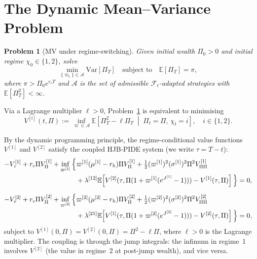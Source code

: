 \documentclass[11pt,a4paper]{article}
\numberwithin{equation}{section}
\newtheorem{problem}[theorem]{Problem}
\newcommand{\E}{\mathbb{E}}
\newcommand{\Var}{\mathrm{Var}}
\newcommand{\F}{\mathcal{F}}
\begin{document}
\section{The Dynamic Mean--Variance Problem}\label{sec:mv}


\begin{problem}[MV under regime-switching]\label{prob:mv}
Given initial wealth $\Pi_0 > 0$ and initial regime $\chi_0 \in \{1,2\}$, solve
\begin{equation}\label{eq:mv_problem}
\min_{\{\varpi_t\} \in \mathcal{A}} \Var[\Pi_T] \quad \text{subject to} \quad \E[\Pi_T] = \pi,
\end{equation}
where $\pi > \Pi_0 e^{r_c T}$ and $\mathcal{A}$ is the set of admissible $\F_t$-adapted strategies with $\E[\Pi_T^2] < \infty$.
\end{problem}

Via a Lagrange multiplier $\ell > 0$, Problem~\ref{prob:mv} is equivalent to minimising
\begin{equation}\label{eq:J_def}
V^{[i]}(t, \Pi) := \inf_{\varpi \in \mathcal{A}} \E\!\left[\Pi_T^2 - \ell \Pi_T \;\middle|\; \Pi_t = \Pi,\, \chi_t = i\right], \quad i \in \{1,2\}.
\end{equation}


By the dynamic programming principle, the regime-conditional value functions $V^{[1]}$ and $V^{[2]}$ satisfy the coupled HJB-PIDE system (we write $\tau = T - t$):
\begin{align}
-V^{[1]}_\tau + r_c\Pi V^{[1]}_\Pi + \inf_{\varpi^{[1]}} \Big\{& \varpi^{[1]}(\mu^{[1]} - r_h)\Pi V^{[1]}_\Pi + \tfrac{1}{2}(\varpi^{[1]})^2 (\sigma^{[1]})^2 \Pi^2 V^{[1]}_{\Pi\Pi} \notag \\
& + \lambda^{[12]} \E\!\left[V^{[2]}(\tau, \Pi(1+\varpi^{[1]}(e^{J^{[1]}}-1))) - V^{[1]}(\tau, \Pi)\right] \Big\} = 0, \label{eq:hjb1} \\[6pt]
-V^{[2]}_\tau + r_c\Pi V^{[2]}_\Pi + \inf_{\varpi^{[2]}} \Big\{& \varpi^{[2]}(\mu^{[2]} - r_h)\Pi V^{[2]}_\Pi + \tfrac{1}{2}(\varpi^{[2]})^2 (\sigma^{[2]})^2 \Pi^2 V^{[2]}_{\Pi\Pi} \notag \\
& + \lambda^{[21]} \E\!\left[V^{[1]}(\tau, \Pi(1+\varpi^{[2]}(e^{J^{[2]}}-1))) - V^{[2]}(\tau, \Pi)\right] \Big\} = 0, \label{eq:hjb2}
\end{align}
subject to $V^{[1]}(0, \Pi) = V^{[2]}(0, \Pi) = \Pi^2 - \ell \Pi$, where $\ell > 0$ is the Lagrange multiplier. The coupling is through the jump integrals: the infimum in regime~1 involves $V^{[2]}$ (the value in regime~2 at post-jump wealth), and vice versa.
\end{document}
